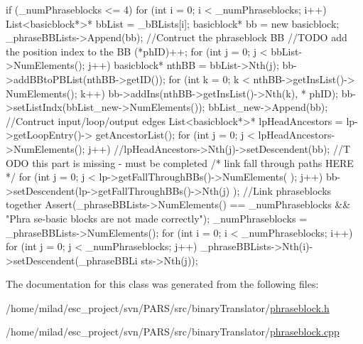 \begin{DoxyCode}
                                                                                 
           {
        if (_numPhraseblocks <= 4) {
                for (int i = 0; i < _numPhraseblocks; i++) {
                        List<basicblock*>* bbList = _bBLists[i];
                        basicblock* bb = new basicblock;
                        _phraseBBLists->Append(bb);
                        //Contruct the phraseblock BB
                        //TODO add the position index to the BB
                        (*phID)++;
                        for (int j = 0; j < bbList->NumElements(); j++) {
                                basicblock* nthBB = bbList->Nth(j);
                                bb->addBBtoPBList(nthBB->getID());
                                for (int k = 0; k < nthBB->getInsList()->
      NumElements(); k++) {
                                        bb->addIns(nthBB->getInsList()->Nth(k), *
      phID);
                                }
                        }
                        bb->setListIndx(bbList_new->NumElements());
                        bbList_new->Append(bb);
                        //Contruct input/loop/output edges
                        List<basicblock*>* lpHeadAncestors = lp->getLoopEntry()->
      getAncestorList();
                        for (int j = 0; j < lpHeadAncestors->NumElements(); j++) 
      {
                                //lpHeadAncestors->Nth(j)->setDescendent(bb); //T
      ODO this part is missing - must be completed
                        }
                        /* link fall through paths HERE */
                        for (int j = 0; j < lp->getFallThroughBBs()->NumElements(
      ); j++) {
                                bb->setDescendent(lp->getFallThroughBBs()->Nth(j)
      );
                        }
                }
                //Link phraseblocks together
                Assert(_phraseBBLists->NumElements() == _numPhraseblocks && "Phra
      se-basic blocks are not made correctly");
                _numPhraseblocks = _phraseBBLists->NumElements();
                for (int i = 0; i < _numPhraseblocks; i++) {
                        for (int j = 0; j < _numPhraseblocks; j++) {
                                _phraseBBLists->Nth(i)->setDescendent(_phraseBBLi
      sts->Nth(j));
                        }
                }
        }
}\end{DoxyCode}


The documentation for this class was generated from the following files:\begin{DoxyCompactItemize}
\item 
/home/milad/esc\_\-project/svn/PARS/src/binaryTranslator/\hyperlink{phraseblock_8h}{phraseblock.h}\item 
/home/milad/esc\_\-project/svn/PARS/src/binaryTranslator/\hyperlink{phraseblock_8cpp}{phraseblock.cpp}\end{DoxyCompactItemize}
